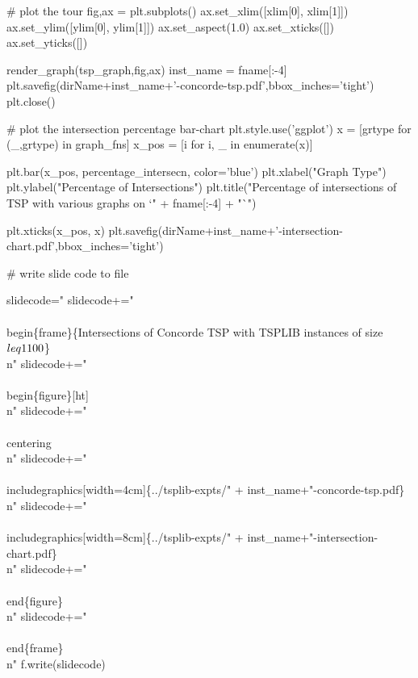               # plot the tour
              fig,ax = plt.subplots()
              ax.set_xlim([xlim[0], xlim[1]])
              ax.set_ylim([ylim[0], ylim[1]])
              ax.set_aspect(1.0)
              ax.set_xticks([])
              ax.set_yticks([])
 
              render_graph(tsp_graph,fig,ax)
              inst_name = fname[:-4]
              plt.savefig(dirName+inst_name+'-concorde-tsp.pdf',bbox_inches='tight')
              plt.close()
              
              # plot the intersection percentage bar-chart
              plt.style.use('ggplot')
              x              = [grtype for (_,grtype) in graph_fns]
              x_pos          = [i for i, _ in enumerate(x)]
     
              plt.bar(x_pos, percentage_intersecn, color='blue')
              plt.xlabel("Graph Type")
              plt.ylabel("Percentage of Intersections")
              plt.title("Percentage of intersections of TSP with various graphs on `" + fname[:-4] + "`")
 
              plt.xticks(x_pos, x)   
              plt.savefig(dirName+inst_name+'-intersection-chart.pdf',bbox_inches='tight')
                   
              # write slide code to file
             
              slidecode="%
              slidecode+="\\\\begin\{frame\}\{Intersections of Concorde TSP with TSPLIB instances of size $\\\\leq 1100$\}\\n"
              slidecode+="\\\\begin\{figure\}[ht]\\n"
              slidecode+="  \\\\centering\\n"
              slidecode+="  \\\\includegraphics[width=4cm]\{../tsplib-expts/" + inst_name+"-concorde-tsp.pdf\}\\n"
              slidecode+="  \\\\includegraphics[width=8cm]\{../tsplib-expts/" + inst_name+"-intersection-chart.pdf\}\\n"
              slidecode+="\\\\end\{figure\}\\n"
              slidecode+="\\\\end\{frame\}\\n"
              f.write(slidecode)


